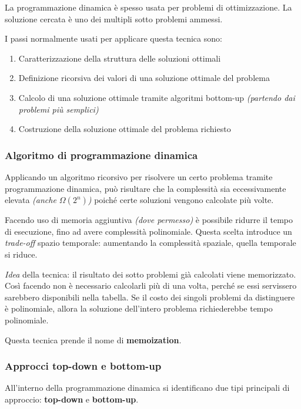 \documentclass[italian, 10pt]{article}
\begin{document}
La programmazione dinamica è spesso usata per problemi di ottimizzazione.
La soluzione cercata è uno dei multipli sotto problemi ammessi.

\bigskip
I passi normalmente usati per applicare questa tecnica sono:

\begin{enumerate}
  \item Caratterizzazione della struttura delle soluzioni ottimali
  \item Definizione ricorsiva dei valori di una soluzione ottimale del problema
  \item Calcolo di una soluzione ottimale tramite algoritmi bottom-up \textit{(partendo dai problemi più semplici)}
  \item Costruzione della soluzione ottimale del problema richiesto
\end{enumerate}

\subsubsection{Algoritmo di programmazione dinamica}

Applicando un algoritmo ricorsivo per risolvere un certo problema tramite programmazione dinamica, può risultare che la complessità sia eccessivamente elevata \textit{(anche \(\Omega(2^n)\))} poiché certe soluzioni vengono calcolate più volte.

Facendo uso di memoria aggiuntiva \textit{(dove permesso)} è possibile ridurre il tempo di esecuzione, fino ad avere complessità polinomiale.
Questa scelta introduce un \textit{trade-off} spazio temporale: aumentando la complessità spaziale, quella temporale si riduce.

\bigskip
\textit{Idea} della tecnica:
il risultato dei sotto problemi già calcolati viene memorizzato.
Così facendo non è necessario calcolarli più di una volta, perché se essi servissero sarebbero disponibili nella tabella.
Se il costo dei singoli problemi da distinguere è polinomiale, allora la soluzione dell'intero problema richiederebbe tempo polinomiale.

Questa tecnica prende il nome di \textbf{memoization}.

\subsubsection{Approcci top-down e bottom-up}

All'interno della programmazione dinamica si identificano due tipi principali di approccio: \textbf{top-down} e \textbf{bottom-up}.
\end{document}
